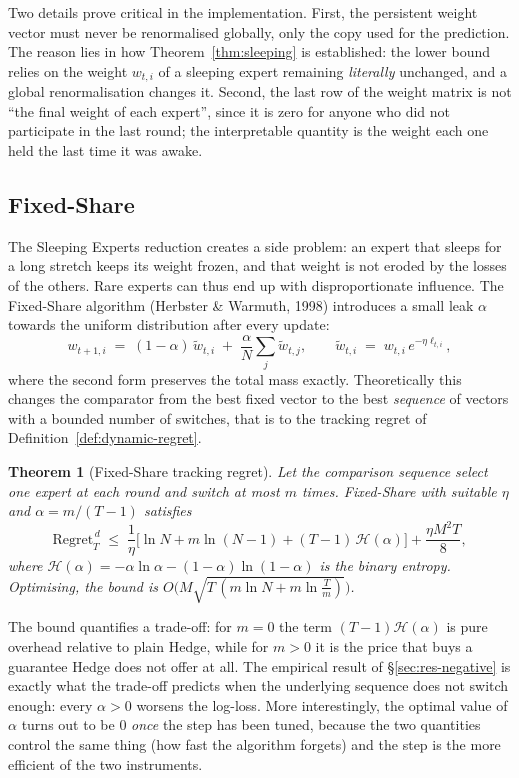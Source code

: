 \documentclass[12pt,a4paper,oneside]{report}
\renewcommand{\_}{\oldunderscore\allowbreak}
\theoremstyle{definition}
\theoremstyle{plain}
\newtheorem{theorem}{Theorem}[chapter]
\theoremstyle{remark}
\begin{document}
Two details prove critical in the implementation. First, the persistent weight vector must never
be renormalised globally, only the copy used for the prediction. The reason lies in how
Theorem~\ref{thm:sleeping} is established: the lower bound relies on the weight $w_{t,i}$ of a
sleeping expert remaining
\emph{literally} unchanged, and a global renormalisation changes it. Second, the last row of
the weight matrix is not ``the final weight of each expert'', since it is zero for anyone who
did not participate in the last round; the interpretable quantity is the weight each one held
the last time it was awake.

\subsection{Fixed-Share}
\label{sec:fixed-share}

The Sleeping Experts reduction creates a side problem: an expert that sleeps for a long stretch
keeps its weight frozen, and that weight is not eroded by the losses of the others. Rare experts
can thus end up with disproportionate influence. The Fixed-Share algorithm (Herbster \& Warmuth,
1998) introduces a small leak $\alpha$ towards the uniform distribution after every update:
\[
w_{t+1,i} \;=\; (1-\alpha)\,\tilde{w}_{t,i} \;+\; \frac{\alpha}{N}\sum_{j} \tilde{w}_{t,j},
\qquad \tilde{w}_{t,i} \;=\; w_{t,i}\,e^{-\eta \ell_{t,i}},
\]
where the second form preserves the total mass exactly. Theoretically this changes the
comparator from the best fixed vector to the best \emph{sequence} of vectors with a bounded
number of switches, that is to the tracking regret of
Definition~\ref{def:dynamic-regret}.

\begin{theorem}[Fixed-Share tracking regret]
\label{thm:fixed-share}
Let the comparison sequence select one expert at each round and switch at most $m$ times.
Fixed-Share with suitable $\eta$ and $\alpha = m/(T-1)$ satisfies
\[
\mathrm{Regret}_T^{\,d} \;\leq\; \frac{1}{\eta}\Big[ \ln N + m \ln(N-1)
+ (T-1)\,\mathcal{H}(\alpha) \Big] + \frac{\eta M^2 T}{8},
\]
where $\mathcal{H}(\alpha) = -\alpha\ln\alpha - (1-\alpha)\ln(1-\alpha)$ is the binary entropy.
Optimising, the bound is $O\big(M\sqrt{T\,(m\ln N + m\ln\frac{T}{m})}\big)$.
\end{theorem}

The bound quantifies a trade-off: for $m=0$ the term $(T-1)\mathcal{H}(\alpha)$ is pure overhead
relative to plain Hedge, while for $m>0$ it is the price that buys a guarantee Hedge does not
offer at all. The empirical result of \S\ref{sec:res-negative} is exactly what the trade-off
predicts when the underlying sequence does not switch enough: every $\alpha>0$ worsens the
log-loss. More interestingly, the optimal value of $\alpha$ turns out to be $0$ \emph{once} the
step has been tuned, because the two quantities control the same thing (how fast the algorithm
forgets) and the step is the more efficient of the two instruments.
\end{document}
